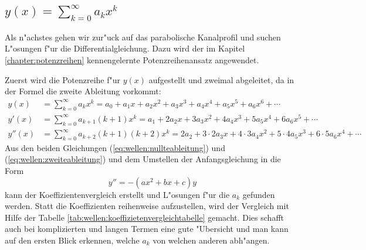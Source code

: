 \subsection{\texorpdfstring{$y(x) = \sum_{k = 0}^{\infty} a_{k}x^k$}{y(x) = 
summe k = 0 bis unendlich ak xk}}
\label{subsec:wellen:Potenzreihenansatz}

Als n"achstes gehen wir zur"uck auf das parabolische Kanalprofil und suchen 
L"osungen f"ur die Differentialgleichung. Dazu wird der im Kapitel 
\ref{chapter:potenzreihen} kennengelernte Potenzreihenansatz angewendet.

Zuerst wird die Potenzreihe f"ur $y(x)$ aufgestellt und zweimal abgeleitet, da 
in der Formel die zweite Ableitung vorkommt:
\begin{align}
	y(x)
	&=
	\sum_{k = 0}^{\infty} a_{k}x^k
	=
	a_0 + a_1x + a_2x^2 + a_3x^3 + a_4x^4 + a_5x^5 + a_6x^6 + \dotsb
	\label{eq:wellen:nullteableitung}
	\\
	y'(x)
	&=
	\sum_{k=0}^{\infty} a_{k+1}(k+1)x^k
	=
	a_1 + 2a_2x + 3a_3x^2 + 4a_4x^3 + 5a_5x^4 + 6a_6x^5+ \dotsb
	\\
	y''(x)
	&=
	\sum_{k = 0}^{\infty} a_{k+2}(k+1)(k+2)x^k
	=
	2a_2 + 3 \mathbin{\cdot} 2a_3x + 4 \mathbin{\cdot} 3a_4x^2 + 5 
	\mathbin{\cdot} 4a_5x^3 + 6 \mathbin{\cdot} 5a_6x^4 + \dotsb
	\label{eq:wellen:zweiteableitung}
\end{align}
Aus den beiden Gleichungen (\ref{eq:wellen:nullteableitung}) und
(\ref{eq:wellen:zweiteableitung}) und dem Umstellen der Anfangsgleichung in die 
Form
\begin{equation*}
	y'' = -(ax^2+bx+c)y
\end{equation*}
kann der Koeffizientenvergleich erstellt und L"osungen f"ur die $a_k$ gefunden 
werden. Statt die Koeffizienten reihenweise aufzustellen, wird der Vergleich 
mit Hilfe der Tabelle \ref{tab:wellen:koeffizietenvergleichtabelle} gemacht. 
Dies schafft auch bei komplizierten und langen Termen eine gute "Ubersicht und 
man kann auf den ersten Blick erkennen, welche $a_k$ von welchen anderen 
abh"angen.

